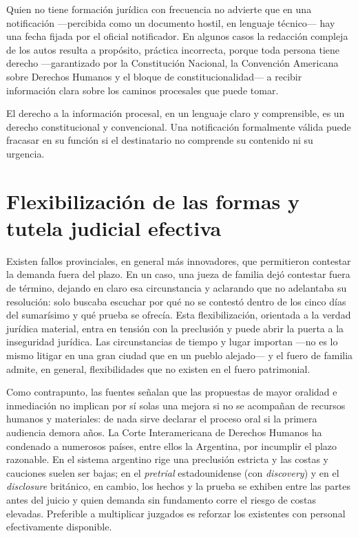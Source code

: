 \documentclass[12pt,oneside]{book}
\begin{document}
Quien no tiene formación jurídica con frecuencia no advierte que en una notificación ---percibida como un documento hostil, en lenguaje técnico--- hay una fecha fijada por el oficial notificador. En algunos casos la redacción compleja de los autos resulta a propósito, práctica incorrecta, porque toda persona tiene derecho ---garantizado por la Constitución Nacional, la Convención Americana sobre Derechos Humanos y el bloque de constitucionalidad--- a recibir información clara sobre los caminos procesales que puede tomar.

\begin{important}
El derecho a la información procesal, en un lenguaje claro y comprensible, es un derecho constitucional y convencional. Una notificación formalmente válida puede fracasar en su función si el destinatario no comprende su contenido ni su urgencia.
\end{important}

\section{Flexibilización de las formas y tutela judicial efectiva}

Existen fallos provinciales, en general más innovadores, que permitieron contestar la demanda fuera del plazo. En un caso, una jueza de familia dejó contestar fuera de término, dejando en claro esa circunstancia y aclarando que no adelantaba su resolución: solo buscaba escuchar por qué no se contestó dentro de los cinco días del sumarísimo y qué prueba se ofrecía. Esta flexibilización, orientada a la verdad jurídica material, entra en tensión con la preclusión y puede abrir la puerta a la inseguridad jurídica. Las circunstancias de tiempo y lugar importan ---no es lo mismo litigar en una gran ciudad que en un pueblo alejado--- y el fuero de familia admite, en general, flexibilidades que no existen en el fuero patrimonial.

Como contrapunto, las fuentes señalan que las propuestas de mayor oralidad e inmediación no implican por sí solas una mejora si no se acompañan de recursos humanos y materiales: de nada sirve declarar el proceso oral si la primera audiencia demora años. La Corte Interamericana de Derechos Humanos ha condenado a numerosos países, entre ellos la Argentina, por incumplir el plazo razonable. En el sistema argentino rige una preclusión estricta y las costas y cauciones suelen ser bajas; en el \emph{pretrial} estadounidense (con \emph{discovery}) y en el \emph{disclosure} británico, en cambio, los hechos y la prueba se exhiben entre las partes antes del juicio y quien demanda sin fundamento corre el riesgo de costas elevadas. Preferible a multiplicar juzgados es reforzar los existentes con personal efectivamente disponible.
\end{document}

